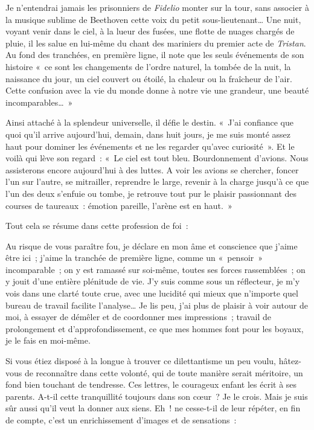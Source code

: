 \documentclass[french,twoside]{book} %
\newenvironment{quoteblock}%
  {\begin{quoting}}
  {\end{quoting}}
\newenvironment{quotebar}{%
    \def\FrameCommand{{\color{rubric!10!}\vrule width 0.5em} \hspace{0.9em}}%
    \def\OuterFrameSep{\itemsep} %
    \MakeFramed {\advance\hsize-\width \FrameRestore}
  }%
  {%
    \endMakeFramed
  }
\renewenvironment{quoteblock}%
  {%
    \savenotes
    \setstretch{0.9}
    \normalfont
    \begin{quotebar}
  }
  {%
    \end{quotebar}
    \spewnotes
  }
\begin{document}
\noindent Je n’entendrai jamais les prisonniers de {\itshape Fidelio} monter sur la tour, sans associer à la musique sublime de Beethoven cette voix du petit sous-lieutenant… Une nuit, voyant venir dans le ciel, à la lueur des fusées, une flotte de nuages chargés de pluie, il les salue en lui-même du chant des mariniers du premier acte de {\itshape Tristan}. Au fond des tranchées, en première ligne, il note que les seuls événements de son histoire « ce sont les changements de l’ordre naturel, la tombée de la nuit, la naissance du jour, un ciel couvert ou étoilé, la chaleur ou la fraîcheur de l’air. Cette confusion avec la vie du monde donne à notre vie une grandeur, une beauté incomparables… »‌\par
Ainsi attaché à la splendeur universelle, il défie le destin. « J’ai confiance que quoi qu’il arrive aujourd’hui, demain, dans huit jours, je me suis monté assez haut pour dominer les événements et ne les regarder qu’avec curiosité ». Et le voilà qui lève son regard : « Le ciel est tout bleu. Bourdonnement d’avions. Nous assisterons encore aujourd’hui à des luttes. A voir les avions se chercher, foncer l’un sur l’autre, se mitrailler, reprendre le large, revenir à la charge jusqu’à ce que l’un des deux s’enfuie ou tombe, je retrouve tout pur le plaisir passionnant des courses de taureaux : émotion pareille, l’arène est en haut. »‌\par
Tout cela se résume dans cette profession de foi :‌\par

\begin{quoteblock}
 \noindent Au risque de vous paraître fou, je déclare en mon âme et conscience que j’aime être ici ; j’aime la tranchée de première ligne, comme un « pensoir » incomparable ; on y est ramassé sur soi-même, toutes ses forces rassemblées ; on y jouit d’une entière plénitude de vie. J’y suis comme sous un réflecteur, je m’y vois dans une clarté toute crue, avec une lucidité qui mieux que n’importe quel bureau de travail facilite l’analyse… Je lis peu, j’ai plus de plaisir à voir autour de moi, à essayer de démêler et de coordonner mes impressions ; travail de prolongement et d’approfondissement, ce que mes hommes font pour les boyaux, je le fais en moi-même.‌
 \end{quoteblock}

\noindent Si vous étiez disposé à la longue à trouver ce dilettantisme un peu voulu, hâtez-vous de reconnaître dans cette volonté, qui de toute manière serait méritoire, un fond bien touchant de tendresse. Ces lettres, le courageux enfant les écrit à ses parents. A-t-il cette tranquillité toujours dans son cœur ? Je le crois. Mais je suis sûr aussi qu’il veut la donner aux siens. Eh ! ne cesse-t-il de leur répéter, en fin de compte, c’est un enrichissement d’images et de sensations :‌\par
\end{document}
